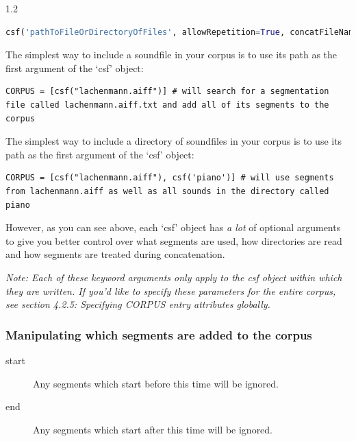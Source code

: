 \documentclass{article}
\begin{document}
\begin{spacing}{1.2}
\begin{lstlisting}[language=python]
csf('pathToFileOrDirectoryOfFiles', allowRepetition=True, concatFileName=None,  end=None,  envelopeSlope=1,  excludeStr=None,  excludeTimes=[], hasParams=False, includeStr=None,  includeTimes=[],  limit={},  limitDur=None,  midiPitchMethod='composite',  offsetLen='30\%',  onsetLen=0.01,  recursive=True,  restrictInTime=0,  restrictOverlaps=None,  restrictRepetition=0.1,  scaleDb=0.0,  scaleDistance=1,  postSelectAmpBool=False, postSelectAmpMin=-12, postSelectAmpMax=+12, postSelectAmpMethod='power-mean-seg', segmentationExtension='.txt',  segmentationFile=None,  start=None,  superimposeRule=None,  transMethod=None,  transQuantize=0,  wholeFile=False, MWinstrName=None,  MWtext=None, MWnotehead='.')
\end{lstlisting}


The simplest way to include a soundfile in your corpus is to use its path as the first argument of the `csf' object:
\begin{lstlisting}
CORPUS = [csf("lachenmann.aiff")] # will search for a segmentation file called lachenmann.aiff.txt and add all of its segments to the corpus
\end{lstlisting}

The simplest way to include a directory of soundfiles in your corpus is to use its path as the first argument of the `csf' object:
\begin{lstlisting}
CORPUS = [csf("lachenmann.aiff"), csf('piano')] # will use segments from lachenmann.aiff as well as all sounds in the directory called piano
\end{lstlisting}

\noindent However, as you can see above, each `csf' object has \emph{a lot} of optional arguments to give you better control over what segments are used, how directories are read and how segments are treated during concatenation.  

\emph{Note: Each of these keyword arguments only apply to the csf object within which they are written.  If you'd like to specify these parameters for the entire corpus, see section 4.2.5: Specifying CORPUS entry attributes globally.}

\subsubsection{Manipulating which segments are added to the corpus}
\begin{description}
\item[start] Any segments which start before this time will be ignored.
\item[end] Any segments which start after this time will be ignored.
\end{description}


\end{spacing}
\end{document}
